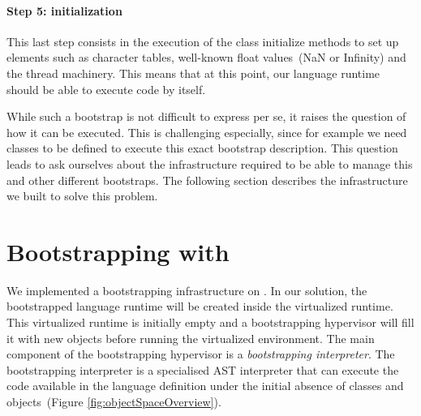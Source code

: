 \paragraph{\textbf{Step 5: initialization}}
This last step consists in the execution of the class initialize methods to set up elements such as character tables, well-known float values~(\eg NaN or Infinity) and the thread machinery. This means that at this point, our language runtime should be able to execute code by itself.
\newline

While such a bootstrap is not difficult to express per se, it raises the question of how it can be executed. This is challenging especially, since for example we need classes to be defined to execute this exact bootstrap description. This question leads to ask ourselves about the infrastructure required to be able to manage this and other different bootstraps. The following section describes the infrastructure we built to solve this problem.

\section{Bootstrapping with \Vtt}\label{sec:bootstrapping_infrastructure}

We implemented a bootstrapping infrastructure on \Vtt. In our solution, the bootstrapped language runtime will be created inside the virtualized runtime. This virtualized runtime is initially empty and a bootstrapping hypervisor will fill it with new objects before running the virtualized environment. The main component of the bootstrapping hypervisor is a \emph{bootstrapping interpreter}. The bootstrapping interpreter is a specialised AST interpreter that can execute the code available in the language definition under the initial absence of classes and objects~(Figure \ref{fig:objectSpaceOverview}).

